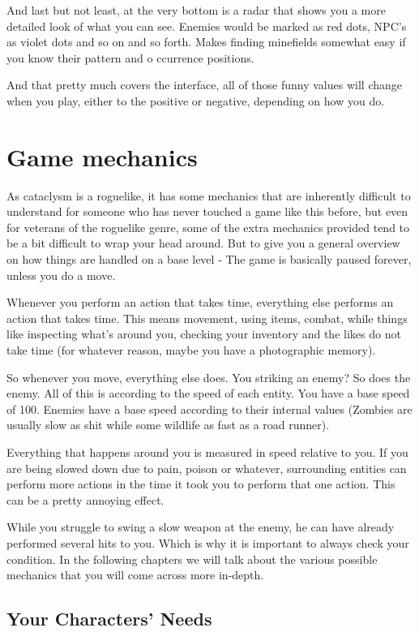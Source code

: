 And last but not least, at the very bottom is a radar that shows you a more detailed look of what you can see. Enemies would be marked as red dots, NPC's as violet dots and so on and so forth. Makes finding minefields somewhat easy if you know their pattern and o
ccurrence positions.

And that pretty much covers the interface, all of those funny values will change when you play, either to the positive or negative, depending on how you do.

\section{Game mechanics}

As cataclysm is a roguelike, it has some mechanics that are inherently difficult to understand for someone who has never touched a game like this before, but even for veterans of the roguelike genre, some of the extra mechanics provided tend to be a bit difficult to wrap your head around. But to give you a general overview on how things are handled on a base level - The game is basically paused forever, unless you do a move.

Whenever you perform an action that takes time, everything else performs an action that takes time. This means movement, using items, combat, while things like inspecting what's around you, checking your inventory and the likes do not take time (for whatever reason, maybe you have a photographic memory).

So whenever you move, everything else does. You striking an enemy? So does the enemy. All of this is according to the speed of each entity. You have a base speed of 100. Enemies have a base speed according to their internal values (Zombies are usually slow as shit while some wildlife as fast as a road runner).

Everything that happens around you is measured in speed relative to you. If you are being slowed down due to pain, poison or whatever, surrounding entities can perform more actions in the time it took you to perform that one action. This can be a pretty annoying effect. 

While you struggle to swing a slow weapon at the enemy, he can have already performed several hits to you. Which is why it is important to always check your condition. In the following chapters we will talk about the various possible mechanics that you will come across more in-depth.

\subsection{Your Characters' Needs}

